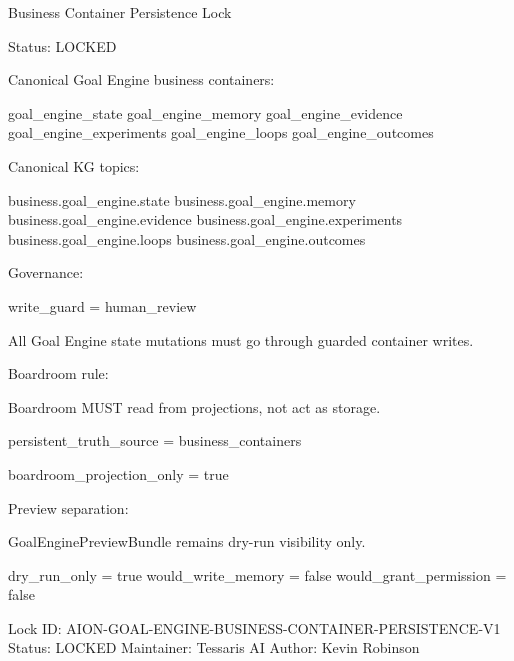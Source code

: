 Business Container Persistence Lock

Status: LOCKED

Canonical Goal Engine business containers:

goal\_engine\_state
goal\_engine\_memory
goal\_engine\_evidence
goal\_engine\_experiments
goal\_engine\_loops
goal\_engine\_outcomes

Canonical KG topics:

business.goal_engine.state
business.goal_engine.memory
business.goal_engine.evidence
business.goal_engine.experiments
business.goal_engine.loops
business.goal_engine.outcomes

Governance:

write_guard = human_review

All Goal Engine state mutations must go through guarded container writes.

Boardroom rule:

Boardroom MUST read from projections, not act as storage.

persistent_truth_source = business_containers

boardroom_projection_only = true

Preview separation:

GoalEnginePreviewBundle remains dry-run visibility only.

dry_run_only = true
would_write_memory = false
would_grant_permission = false

Lock ID: AION-GOAL-ENGINE-BUSINESS-CONTAINER-PERSISTENCE-V1
Status: LOCKED
Maintainer: Tessaris AI
Author: Kevin Robinson
